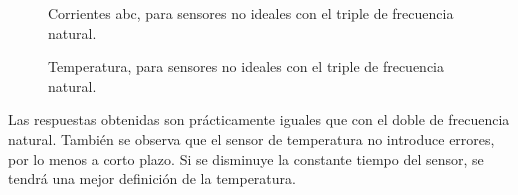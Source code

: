 \documentclass[a4paper, 10pt, onecolumn,journal]{ieeeconf}
\begin{document}
\begin{figure}[H]
	\centering
	\begin{adjustbox}{scale=0.55,max width=\columnwidth}
	\end{adjustbox}
	\caption{Corrientes abc, para sensores no ideales con el triple de frecuencia natural.}
	\label{Corrientes abc, para sensores no ideales con el triple de frecuencia natural}
\end{figure}

\begin{figure}[H]
	\centering
	\begin{adjustbox}{scale=0.55,max width=\columnwidth}
	\end{adjustbox}
	\caption{Temperatura, para sensores no ideales con el triple de frecuencia natural.}
	\label{Temperatura, para sensores no ideales con el triple de frecuencia natural}
\end{figure}
Las respuestas obtenidas son prácticamente iguales que con el doble de frecuencia natural. También se observa que el sensor de temperatura no introduce errores, por lo menos a corto plazo. Si se disminuye la constante tiempo del sensor, se tendrá una mejor definición de la temperatura.
\end{document}
